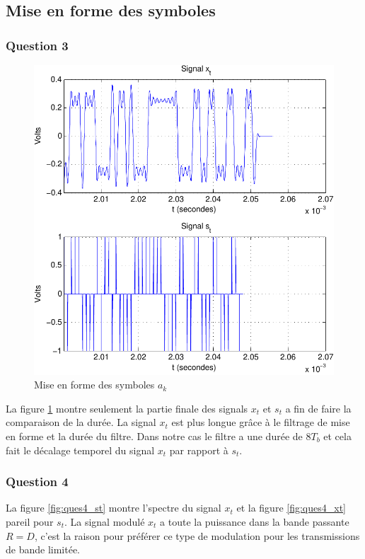 \documentclass[a4paper,11pt]{article}
\begin{document}
\subsection{Mise en forme des symboles}

\subsubsection*{Question 3}

\begin{figure}[htb]
	\begin{center}
	\includegraphics[scale=1]{question3-crop.pdf}
	\caption{Mise en forme des symboles $a_k$}
	\label{fig:ques3}
	\end{center}
\end{figure} 

La figure \ref{fig:ques3} montre seulement la partie finale des signals $x_t$ et $s_t$ a fin de faire la comparaison de la durée. La signal $x_t$ est plus longue grâce à le filtrage de mise en forme et la durée du filtre. Dans notre cas le filtre a une durée de $8T_b$ et cela fait le décalage temporel du signal $x_t$ par rapport à $s_t$.  

\subsubsection*{Question 4}
La figure \ref{fig:ques4_st} montre l'spectre du signal $x_t$ et la figure \ref{fig:ques4_xt} pareil pour $s_t$. La signal modulé $x_t$ a toute la puissance dans la bande passante $R=D$, c'est la raison pour préférer ce type de modulation pour les transmissions de bande limitée.\\
\end{document}
